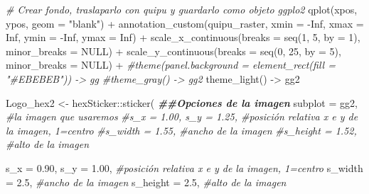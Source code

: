 \documentclass[
]{article}
\newenvironment{Shaded}{\begin{snugshade}}{\end{snugshade}}
\newcommand{\AttributeTok}[1]{\textcolor[rgb]{0.77,0.63,0.00}{#1}}
\newcommand{\CommentTok}[1]{\textcolor[rgb]{0.56,0.35,0.01}{\textit{#1}}}
\newcommand{\ConstantTok}[1]{\textcolor[rgb]{0.00,0.00,0.00}{#1}}
\newcommand{\DecValTok}[1]{\textcolor[rgb]{0.00,0.00,0.81}{#1}}
\newcommand{\DocumentationTok}[1]{\textcolor[rgb]{0.56,0.35,0.01}{\textbf{\textit{#1}}}}
\newcommand{\FloatTok}[1]{\textcolor[rgb]{0.00,0.00,0.81}{#1}}
\newcommand{\FunctionTok}[1]{\textcolor[rgb]{0.00,0.00,0.00}{#1}}
\newcommand{\NormalTok}[1]{#1}
\newcommand{\OtherTok}[1]{\textcolor[rgb]{0.56,0.35,0.01}{#1}}
\newcommand{\SpecialCharTok}[1]{\textcolor[rgb]{0.00,0.00,0.00}{#1}}
\newcommand{\StringTok}[1]{\textcolor[rgb]{0.31,0.60,0.02}{#1}}
\begin{document}
\begin{Shaded}
\begin{Highlighting}[]
\CommentTok{\# Crear fondo, traslaparlo con quipu y guardarlo como objeto ggplo2}
\FunctionTok{qplot}\NormalTok{(xpos, ypos, }\AttributeTok{geom =} \StringTok{"blank"}\NormalTok{) }\SpecialCharTok{+} 
  \FunctionTok{annotation\_custom}\NormalTok{(quipu\_raster, }
                    \AttributeTok{xmin =} \SpecialCharTok{{-}}\ConstantTok{Inf}\NormalTok{, }
                    \AttributeTok{xmax =} \ConstantTok{Inf}\NormalTok{, }
                    \AttributeTok{ymin =} \SpecialCharTok{{-}}\ConstantTok{Inf}\NormalTok{, }
                    \AttributeTok{ymax =} \ConstantTok{Inf}\NormalTok{) }\SpecialCharTok{+} 
  \FunctionTok{scale\_x\_continuous}\NormalTok{(}\AttributeTok{breaks =} \FunctionTok{seq}\NormalTok{(}\DecValTok{1}\NormalTok{, }\DecValTok{5}\NormalTok{, }\AttributeTok{by =} \DecValTok{1}\NormalTok{), }\AttributeTok{minor\_breaks =} \ConstantTok{NULL}\NormalTok{) }\SpecialCharTok{+}
  \FunctionTok{scale\_y\_continuous}\NormalTok{(}\AttributeTok{breaks =} \FunctionTok{seq}\NormalTok{(}\DecValTok{0}\NormalTok{, }\DecValTok{25}\NormalTok{, }\AttributeTok{by =} \DecValTok{5}\NormalTok{), }\AttributeTok{minor\_breaks =} \ConstantTok{NULL}\NormalTok{) }\SpecialCharTok{+}
  \CommentTok{\#theme(panel.background = element\_rect(fill = "\#EBEBEB")) {-}\textgreater{} gg}
  \CommentTok{\#theme\_gray() {-}\textgreater{} gg2}
  \FunctionTok{theme\_light}\NormalTok{() }\OtherTok{{-}\textgreater{}}\NormalTok{ gg2}
  
\NormalTok{Logo\_hex2 }\OtherTok{\textless{}{-}}\NormalTok{ hexSticker}\SpecialCharTok{::}\FunctionTok{sticker}\NormalTok{(}
    \DocumentationTok{\#\#Opciones de la imagen}
    \AttributeTok{subplot              =}\NormalTok{ gg2, }\CommentTok{\#la imagen que usaremos}
    \CommentTok{\#s\_x                  = 1.00, s\_y = 1.25, \#posición relativa x e y de la imagen, 1=centro}
    \CommentTok{\#s\_width              = 1.55, \#ancho de la imagen}
    \CommentTok{\#s\_height             = 1.52, \#alto de la imagen}
    
    \AttributeTok{s\_x                  =} \FloatTok{0.90}\NormalTok{, }
    \AttributeTok{s\_y                  =} \FloatTok{1.00}\NormalTok{, }\CommentTok{\#posición relativa x e y de la imagen, 1=centro}
    \AttributeTok{s\_width              =} \FloatTok{2.5}\NormalTok{, }\CommentTok{\#ancho de la imagen}
    \AttributeTok{s\_height             =} \FloatTok{2.5}\NormalTok{, }\CommentTok{\#alto de la imagen}


\end{Highlighting}
\end{Shaded}
\end{document}
